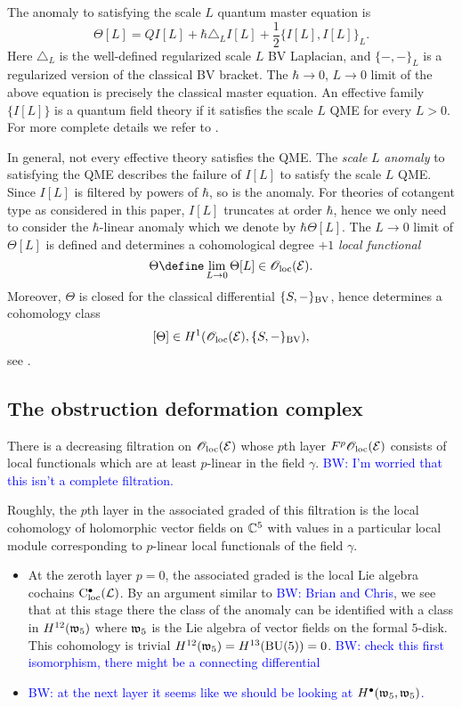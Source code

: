 \documentclass[11pt]{amsart}
\def\brian{\textcolor{blue}{BW: }\textcolor{blue}}
\begin{document}
The anomaly to satisfying the scale $L$ quantum master equation is 
\[
\Theta[L] =
Q I[L] + \hbar \triangle_L I[L] + \frac{1}{2} \{I[L], I[L]\}_L .
\]
Here $\triangle_L$ is the well-defined regularized scale $L$ BV Laplacian, and $\{-,-\}_L$ is a regularized version of the classical BV bracket.
The $\hbar \to 0$, $L \to 0$ limit of the above equation is precisely the classical master equation. 
An effective family $\{I[L]\}$ is a quantum field theory if it satisfies the scale $L$ QME for every $L > 0$. 
For more complete details we refer to \cite[Chapter 8]{Book2}. 

In general, not every effective theory satisfies the QME. 
The {\em scale} $L$ {\em anomaly} to satisfying the QME describes the failure of $I[L]$ to satisfy the scale $L$ QME.
Since $I[L]$ is filtered by powers of $\hbar$, so is the anomaly.
For theories of cotangent type as considered in this paper, $I[L]$ truncates at order $\hbar$, hence we only need to consider the $\hbar$-linear anomaly which we denote by $\hbar \Theta[L]$. 
The $L \to 0$ limit of $\Theta[L]$ is defined and determines a cohomological degree $+1$ {\em local functional}
\[
\Theta \define \lim_{L \to 0} \Theta [L] \in \oloc(\cE) .
\]
Moreover, $\Theta$ is closed for the classical differential $\{S,-\}_{\rm BV}$, hence determines a cohomology class 
\[
[\Theta] \in H^1({\mathscr O}_{\rm loc}(\mathcal E), \{S,-\}_{\rm BV}),
\]
see \cite[\S 5.11]{CostelloBook}.

\subsection{The obstruction deformation complex}

There is a decreasing filtration on ${\mathscr O}_{\rm loc}(\mathcal E)$ whose $p$th layer $F^p {\mathscr O}_{\rm loc}(\mathcal E)$ consists of local functionals which are at least $p$-linear in the field $\gamma$. 
\brian{I'm worried that this isn't a complete filtration.}

Roughly, the $p$th layer in the associated graded of this filtration is the local cohomology of holomorphic vector fields on $\mathbb C^5$ with values in a particular local module corresponding to $p$-linear local functionals of the field $\gamma$. 

\begin{itemize}
\item At the zeroth layer $p=0$, the associated graded is the local Lie algebra cochains ${\rm C}_{\rm loc}^\bullet(\mathcal L)$. 
By an argument similar to \brian{Brian and Chris}, we see that at this stage there the class of the anomaly can be  identified with a class in  $H^{12} (\mathfrak w_5)$ where $\mathfrak w_5$ is the Lie algebra of vector fields on the formal $5$-disk.
This cohomology is trivial $H^{12}(\mathfrak w_5) = H^{13}({\rm BU}(5)) = 0$. 
\brian{check this first isomorphism, there might be a connecting differential}

\item \brian{at the next layer it seems like we should be looking at $H^\bullet(\mathfrak w_5, \mathfrak w_5)$.}
\end{itemize}
\end{document}
